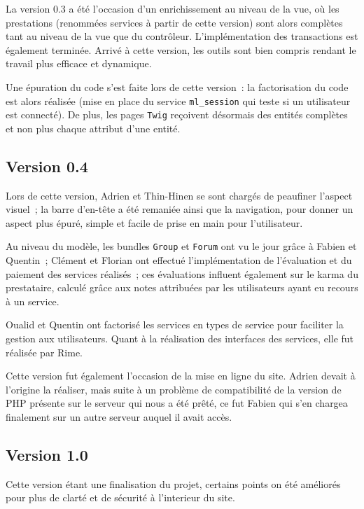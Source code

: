 La version 0.3 a été l'occasion d'un enrichissement au niveau de la vue, où les prestations (renommées services à partir de cette version) sont alors complètes tant au niveau de la vue que du contrôleur. L'implémentation des transactions est également terminée.
Arrivé à cette version, les outils sont bien compris rendant le travail plus efficace et dynamique.

Une épuration du code s'est faite lors de cette version~: la factorisation du code est alors réalisée (mise en place du service \verb|ml_session| qui teste si un utilisateur est connecté). De plus, les pages \verb|Twig| reçoivent désormais des entités complètes et non plus chaque attribut d'une entité.

\subsection{Version 0.4}

Lors de cette version, Adrien et Thin-Hinen se sont chargés de peaufiner l’aspect visuel~; la barre d'en-tête a été remaniée ainsi que la navigation, pour donner un aspect plus épuré, simple et facile de prise en main pour l’utilisateur.

Au niveau du modèle, les bundles \verb|Group| et \verb|Forum| ont vu le jour grâce à Fabien et Quentin~; Clément et Florian ont effectué l'implémentation de l'évaluation et du paiement des services réalisés~; ces évaluations influent également sur le karma du prestataire, calculé grâce aux notes attribuées par les utilisateurs ayant eu recours à un service.

Oualid et Quentin ont factorisé les services en types de service pour faciliter la gestion aux utilisateurs. Quant à la réalisation des interfaces des services, elle fut réalisée par Rime.

Cette version fut également l'occasion de la mise en ligne du site. Adrien devait à l'origine la réaliser, mais suite à un problème de compatibilité de la version de PHP présente sur le serveur qui nous a été prêté, ce fut Fabien qui s'en chargea finalement sur un autre serveur auquel il avait accès.

\subsection{Version 1.0}

Cette version étant une finalisation du projet, certains points on été améliorés pour plus de clarté et de sécurité à l'interieur du site.

